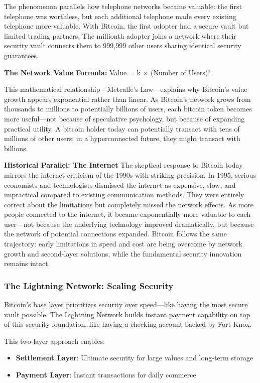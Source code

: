 \documentclass[11pt,oneside]{book}
\begin{document}
The phenomenon parallels how telephone networks became valuable: the first telephone was worthless, but each additional telephone made every existing telephone more valuable. With Bitcoin, the first adopter had a secure vault but limited trading partners. The millionth adopter joins a network where their security vault connects them to 999,999 other users sharing identical security guarantees.

\textbf{The Network Value Formula:}
Value = k × (Number of Users)²

This mathematical relationship—Metcalfe's Law—explains why Bitcoin's value growth appears exponential rather than linear. As Bitcoin's network grows from thousands to millions to potentially billions of users, each bitcoin token becomes more useful—not because of speculative psychology, but because of expanding practical utility. A bitcoin holder today can potentially transact with tens of millions of other users; in a hyperconnected future, they might transact with billions.

\textbf{Historical Parallel: The Internet}
The skeptical response to Bitcoin today mirrors the internet criticism of the 1990s with striking precision. In 1995, serious economists and technologists dismissed the internet as expensive, slow, and impractical compared to existing communication methods. They were entirely correct about the limitations but completely missed the network effects. As more people connected to the internet, it became exponentially more valuable to each user—not because the underlying technology improved dramatically, but because the network of potential connections expanded. Bitcoin follows the same trajectory: early limitations in speed and cost are being overcome by network growth and second-layer solutions, while the fundamental security innovation remains intact.

\subsubsection{The Lightning Network: Scaling Security}

Bitcoin's base layer prioritizes security over speed—like having the most secure vault possible. The Lightning Network builds instant payment capability on top of this security foundation, like having a checking account backed by Fort Knox.

This two-layer approach enables:
\begin{itemize}
\item \textbf{Settlement Layer}: Ultimate security for large values and long-term storage
\item \textbf{Payment Layer}: Instant transactions for daily commerce
\end{itemize}
\end{document}
